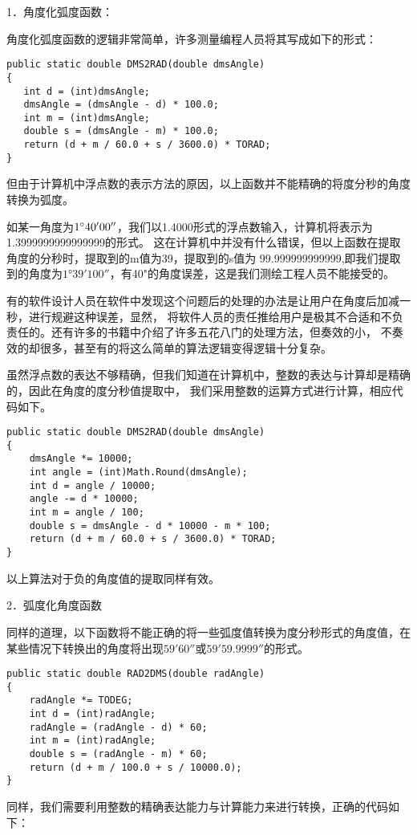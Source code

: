 1．角度化弧度函数：

角度化弧度函数的逻辑非常简单，许多测量编程人员将其写成如下的形式：
\begin{verbatim}
public static double DMS2RAD(double dmsAngle)
{
   int d = (int)dmsAngle;
   dmsAngle = (dmsAngle - d) * 100.0;
   int m = (int)dmsAngle;
   double s = (dmsAngle - m) * 100.0;
   return (d + m / 60.0 + s / 3600.0) * TORAD;
}
\end{verbatim}
但由于计算机中浮点数的表示方法的原因，以上函数并不能精确的将度分秒的角度转换为弧度。

 如某一角度为$1^\circ 40'00''$，我们以1.4000形式的浮点数输入，计算机将表示为1.3999999999999999的形式。
 这在计算机中并没有什么错误，但以上函数在提取角度的分秒时，提取到的m值为39，提取到的s值为
 99.999999999999,即我们提取到的角度为$1°39'100''$，有40"的角度误差，这是我们测绘工程人员不能接受的。
 
 有的软件设计人员在软件中发现这个问题后的处理的办法是让用户在角度后加减一秒，进行规避这种误差，显然，
 将软件人员的责任推给用户是极其不合适和不负责任的。还有许多的书籍中介绍了许多五花八门的处理方法，但奏效的小，
 不奏效的却很多，甚至有的将这么简单的算法逻辑变得逻辑十分复杂。
 
 虽然浮点数的表达不够精确，但我们知道在计算机中，整数的表达与计算却是精确的，因此在角度的度分秒值提取中，
 我们采用整数的运算方式进行计算，相应代码如下。
 
\begin{verbatim}
public static double DMS2RAD(double dmsAngle)
{
    dmsAngle *= 10000; 
    int angle = (int)Math.Round(dmsAngle);
    int d = angle / 10000;
    angle -= d * 10000;
    int m = angle / 100;
    double s = dmsAngle - d * 10000 - m * 100;
    return (d + m / 60.0 + s / 3600.0) * TORAD;
}
\end{verbatim}

 以上算法对于负的角度值的提取同样有效。


2．弧度化角度函数

同样的道理，以下函数将不能正确的将一些弧度值转换为度分秒形式的角度值，在某些情况下转换出的角度将出现$59'60''$或$59'59.9999''$的形式。

\begin{verbatim}
public static double RAD2DMS(double radAngle)
{
    radAngle *= TODEG;
    int d = (int)radAngle;
    radAngle = (radAngle - d) * 60;
    int m = (int)radAngle;
    double s = (radAngle - m) * 60;
    return (d + m / 100.0 + s / 10000.0);
}
\end{verbatim}

同样，我们需要利用整数的精确表达能力与计算能力来进行转换，正确的代码如下：

